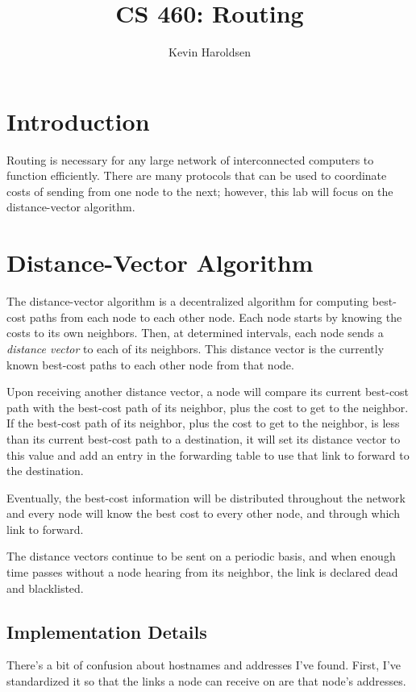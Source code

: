 \documentclass[fleqn,11pt]{article}
\title{CS 460: Routing}
\author{Kevin Haroldsen}
\date{}
\begin{document}
\maketitle

\section{Introduction}
Routing is necessary for any large network of interconnected computers to function efficiently.
There are many protocols that can be used to coordinate costs of sending from one node to the next; however, this lab will focus on the distance-vector algorithm.

\section{Distance-Vector Algorithm}
The distance-vector algorithm is a decentralized algorithm for computing best-cost paths from each node to each other node.
Each node starts by knowing the costs to its own neighbors.
Then, at determined intervals, each node sends a \textit{distance vector} to each of its neighbors.
This distance vector is the currently known best-cost paths to each other node from that node.

Upon receiving another distance vector, a node will compare its current best-cost path with the best-cost path of its neighbor, plus the cost to get to the neighbor.
If the best-cost path of its neighbor, plus the cost to get to the neighbor, is less than its current best-cost path to a destination, it will set its distance vector to this value and add an entry in the forwarding table to use that link to forward to the destination.

Eventually, the best-cost information will be distributed throughout the network and every node will know the best cost to every other node, and through which link to forward.

The distance vectors continue to be sent on a periodic basis, and when enough time passes without a node hearing from its neighbor, the link is declared dead and blacklisted.

\subsection{Implementation Details}
There's a bit of confusion about hostnames and addresses I've found.
First, I've standardized it so that the links a node can receive on are that node's addresses.
\end{document}
